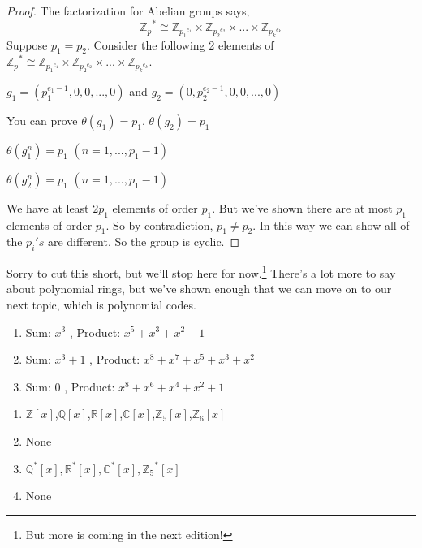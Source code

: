 \begin {proof}
The factorization for Abelian groups says,
\[{\mathbb {Z}_p}^*  \cong {\mathbb{Z}_{{p_1}^{e_1}}}  \times   {\mathbb{Z}_{{p_2}^{e_2}}}  \times  ... \times   {\mathbb{Z}_{{p_k}^{e_k}}}\]
Suppose $p_1 = p_2$. 
Consider the following 2 elements of ${\mathbb {Z}_p}^*  \cong {\mathbb{Z}_{{p_1}^{e_1}}}  \times   {\mathbb{Z}_{{p_2}^{e_2}}}  \times  ... \times   {\mathbb{Z}_{{p_k}^{e_k}}}$.

$g_1 = ( p_1^{e_1-1}, 0, 0,...,0)$ and $g_2 = ( 0, p_2^{e_2-1}, 0, 0,...,0)$

You can prove
$\theta(g_1) = p_1$,                     $  \theta(g_2) = p_1$

$\theta(g_1^n) = p_1$               $ (n = 1,...,p_1-1)$

$\theta(g_2^n) = p_1$              $ (n = 1,...,p_1-1)$

We have at least $2p_1$ elements of order $p_1$. But we've shown there are at most $p_1$ elements of order $p_1$.
So by contradiction, $p_1 \neq p_2$. In this way we can show all of the $p_i's$ are different.
So the group is cyclic.
\end{proof}

Sorry to cut this short, but we'll stop here for now.\footnote{But more is coming in the next edition!}  There's a lot more to say about polynomial rings, but we've shown enough that we can move on to our next topic, which is polynomial codes.

\begin {enumerate} [(1)]
\item
 Sum: $x^3$ , Product: $x^5+x^3+x^2+1$
\item
 Sum: $x^3+1$ , Product: $x^8+x^7+x^5+x^3+x^2$
\item
 Sum: $0$ , Product: $x^8+x^6+x^4+x^2+1$
\end {enumerate}

\begin {enumerate} [(1)]
\item
 $\mathbb{Z}[x]$,$\mathbb{Q}[x]$,$\mathbb{R}[x]$,$\mathbb{C}[x]$,$\mathbb{Z}_5[x]$,$\mathbb{Z}_6[x]$
\item
 None
\item
 $\mathbb{Q}^*[x],\mathbb{R}^*[x], \mathbb{C}^*[x], {\mathbb{Z}_5}^*[x]$
\item
 None
\end {enumerate}

